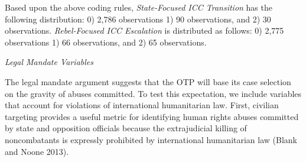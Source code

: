 
Based upon the above coding rules, \emph{State-Focused ICC Transition} has the following distribution: 0) 2,786 observations 1) 90 observations, and 2) 30 observations. \emph{Rebel-Focused ICC Escalation} is distributed as follows: 0) 2,775 observations 1) 66 observations, and 2) 65 observations.

\emph{Legal Mandate Variables }

The legal mandate argument suggests that the OTP will base its case selection on the gravity of abuses committed. To test this expectation, we include variables that account for violations of international humanitarian law. First, civilian targeting provides a useful metric for identifying human rights abuses committed by state and opposition officials because the extrajudicial killing of noncombatants is expressly prohibited by international humanitarian law (Blank and Noone 2013).

